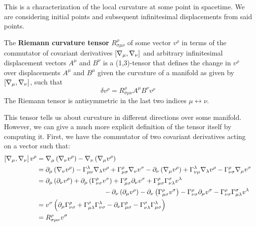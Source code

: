 \documentclass{article}
\begin{document}
 		This is a characterization of the local curvature at some point in spacetime. We are considering initial points and subsequent infinitesimal displacements from said points.
 		\begin{defn}
 			The \textbf{Riemann curvature tensor} $R^{\rho}_{\sigma\mu\nu}$ of some vector $v^\rho$ in terms of the commutator of covariant derivatives $\left[\nabla_\mu, \nabla_\nu \right]$ and arbitrary infinitesimal displacement vectors $A^\mu$ and $B^\nu$ is a (1,3)-tensor that defines the change in $v^\rho$ over displacements $A^\mu$ and $B^\mu$ given the curvature of a manifold as given by $\left[\nabla_\mu, \nabla_\nu \right]$, such that
 			\begin{equation}
 				\label{eq:RiemannTensor}
 				\boxed{\delta v^\rho = R^\rho_{\sigma \mu \nu} A^\mu B^\nu v^\rho}
 			\end{equation}
 			The Riemann tensor is antisymmetric in the last two indices $\mu \leftrightarrow \nu$. 
 		\end{defn}
 		This tensor tells us about curvature in different directions over some manifold. However, we can give a much more explicit definition of the tensor itself by computing it. First, we have the commutator of two covariant derivatives acting on a vector such that:
 		\begin{align*}
 			\left[\nabla_\mu, \nabla_\nu \right] v^\rho &= \nabla_\mu \left( \nabla_\nu v^\rho\right) - \nabla_\nu \left( \nabla_\mu v^\rho \right) \\
 			&= \partial_\mu \left( \nabla_\nu v^\rho \right) - \Gamma^\lambda_{\mu\nu} \nabla_\lambda v^\rho + \Gamma_{\mu\sigma}^\rho \nabla_\nu v^\sigma - \partial_\nu \left( \nabla_\mu v^\rho \right) + \Gamma^\lambda_{\nu\mu} \nabla_\lambda v^\rho - \Gamma_{\nu\sigma}^\rho \nabla_\mu v^\sigma \\
 			&= \partial_\mu \left( \partial_\nu v^\rho\right) + \partial_\mu \left(\Gamma_{\nu\sigma}^\rho v^\sigma \right) + \Gamma_{\mu\sigma}^\rho \partial_\nu v^\sigma + \Gamma_{\mu\sigma}^\rho \Gamma_{\nu\lambda}^\sigma v^\lambda  \\
 			&\quad\quad\quad\quad\quad\quad\quad\quad\quad\quad- \partial_\nu \left( \partial_\mu v^\rho\right) - \partial_\nu \left(\Gamma_{\mu\sigma}^\rho v^\sigma \right) - \Gamma_{\nu\sigma}^\rho \partial_\mu v^\sigma - \Gamma_{\nu\sigma}^\rho \Gamma_{\mu\lambda}^\sigma v^\lambda \\
 			&= v^\sigma \left( \partial_\mu \Gamma_{\nu\sigma}^\rho + \Gamma_{\mu\lambda}^\rho \Gamma_{\nu\sigma}^\lambda - \partial_\nu \Gamma_{\mu\sigma}^\rho - \Gamma_{\nu\lambda}^\rho \Gamma_{\mu\sigma}^\lambda \right)\\
 			&= R^{\rho}_{\sigma\mu\nu}v^\sigma 
 		\end{align*}
\end{document}
